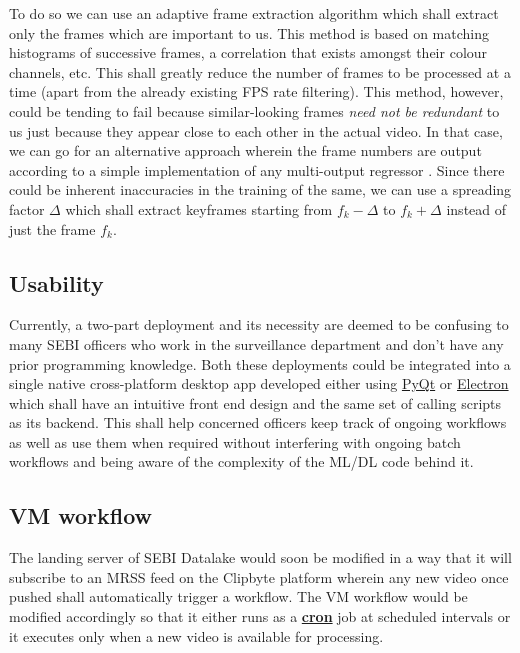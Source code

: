 To do so we can use an adaptive frame extraction algorithm \cite{adapt} which shall extract only the frames which are important to us. This method is based on matching histograms of successive frames, a correlation that exists amongst their colour channels, etc. This shall greatly reduce the number of frames to be processed at a time (apart from the already existing FPS rate filtering). This method, however, could be tending to fail because similar-looking frames \textit{need not be redundant} to us just because they appear close to each other in the actual video. In that case, we can go for an alternative approach wherein the frame numbers are output according to a simple implementation of any multi-output regressor \cite{Brownlee2020}. Since there could be inherent inaccuracies in the training of the same, we can use a spreading factor $\Delta$ which shall extract keyframes starting from ${f}_{k} - \Delta$ to ${f}_{k} + \Delta$ instead of just the frame $f_k$.

\subsection{Usability}

Currently, a two-part deployment and its necessity are deemed to be confusing to many SEBI officers who work in the surveillance department and don’t have any prior programming knowledge. Both these deployments could be integrated into a single native cross-platform desktop app developed either using \href{https://riverbankcomputing.com/software/pyqt/intro}{PyQt} or \href{electronjs.org}{Electron} which shall have an intuitive front end design and the same set of calling scripts as its backend. This shall help concerned officers keep track of ongoing workflows as well as use them when required without interfering with ongoing batch workflows and being aware of the complexity of the ML/DL code behind it.

\subsection{VM workflow} \label{future}

The landing server of SEBI Datalake would soon be modified in a way that it will subscribe to an MRSS feed on the Clipbyte platform wherein any new video once pushed shall automatically trigger a workflow. The VM workflow would be modified accordingly so that it either runs as a \href{https://en.wikipedia.org/wiki/Cron}{\textbf{cron}} job at scheduled intervals or it executes only when a new video is available for processing.
